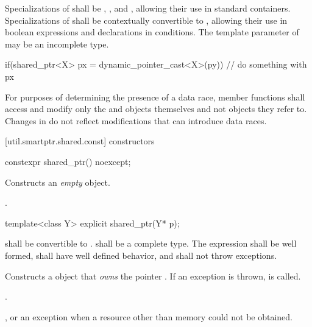 \pnum
Specializations of  shall be ,
, and , allowing their use in standard
containers. Specializations of  shall be
contextually convertible to ,
allowing their use in boolean expressions and declarations in conditions. The template
parameter  of  may be an incomplete type.

\pnum
\enterexample
\begin{codeblock}
if(shared_ptr<X> px = dynamic_pointer_cast<X>(py)) {
  // do something with px
}
\end{codeblock}
\exitexample

\pnum
For purposes of determining the presence of a data race, member functions shall
access and modify only the  and  objects
themselves and not objects they refer to. Changes in  do not
reflect modifications that can introduce data races.

[util.smartptr.shared.const]{ constructors}

%
\begin{itemdecl}
constexpr shared_ptr() noexcept;
\end{itemdecl}

\begin{itemdescr}
\pnum\effects  Constructs an \textit{empty}  object.

\pnum\postconditions  {}.
\end{itemdescr}

%
\begin{itemdecl}
template<class Y> explicit shared_ptr(Y* p);
\end{itemdecl}

\begin{itemdescr}
\pnum\requires  {} shall be convertible to .
 shall be a complete type. The expression 
shall be well formed, shall have well defined behavior, and shall not
throw exceptions.

\pnum\effects Constructs a  object that \textit{owns} the pointer
. If an exception is thrown,  is called.

\pnum\postconditions  {}.

\pnum\throws {}, or an  exception when a resource other than memory could not be obtained.
\end{itemdescr}

